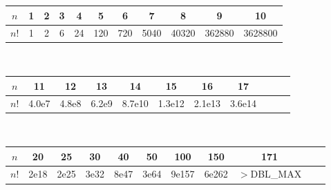 \begin{center}
\begin{tabular}{c|c@{\ }c@{\ }c@{\ }c@{\ }c@{\ }c@{\ }c@{\ }c@{\ }c@{\ }c}
$n$  & 1 & 2 & 3 & 4  & 5   & 6   & 7    & 8     & 9      & 10\\
\hline
$n!$ & 1 & 2 & 6 & 24 & 120 & 720 & 5040 & 40320 & 362880 & 3628800\\
\end{tabular}\\
\begin{tabular}{c|c@{\ }c@{\ }c@{\ }c@{\ }c@{\ }c@{\ }c@{\ }c@{\ }c@{\ }c}
$n$  & 11    & 12    & 13    & 14     & 15     & 16     & 17\\
\hline
$n!$ & 4.0e7 & 4.8e8 & 6.2e9 & 8.7e10 & 1.3e12 & 2.1e13 & 3.6e14\\
\end{tabular}\\
\begin{tabular}{c|c@{\ }c@{\ }c@{\ }c@{\ }c@{\ }c@{\ }c@{\ }c@{\ }c@{\ }c}
$n$  & 20   & 25   & 30   & 40   & 50   & 100   & 150   & 171\\
\hline
$n!$ & 2e18 & 2e25 & 3e32 & 8e47 & 3e64 & 9e157 & 6e262 & \scriptsize{$>$DBL\_MAX}\\
\end{tabular}
\end{center}
